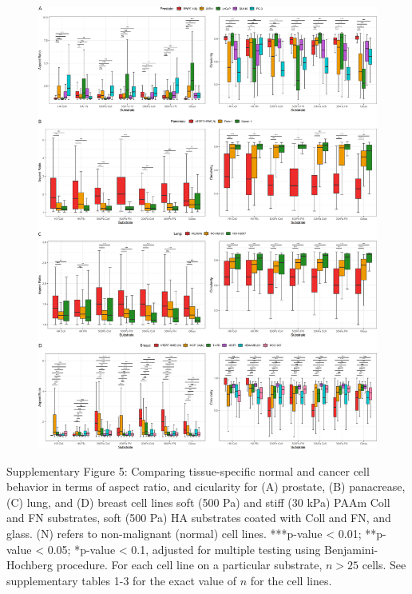 \documentclass[11pt,letterpaper,english,oneside]{article} %
\begin{document}
\begin{figure}[H]
    \hspace*{-1.5cm}
    \centering
    \includegraphics[scale=0.12]{../Figures/Supplementary_Figure5/supplementary_figure5.png}
    \caption{}
    \label{fig:fig5}
\end{figure}
\begin{adjustwidth}{1cm}{1cm}
  Supplementary Figure 5: Comparing tissue-specific normal and cancer cell behavior in terms of aspect ratio, and cicularity for (A) prostate, (B) panacrease, (C) lung, and (D) breast cell lines 
  soft (500 Pa) and stiff (30 kPa) PAAm Coll and FN substrates, soft (500 Pa) HA substrates coated with Coll and FN, and glass. (N) refers to non-malignant (normal) cell lines.
  ***p-value < 0.01; **p-value < 0.05; *p-value < 0.1, adjusted for multiple testing using Benjamini-Hochberg procedure. For each cell line on a particular substrate, $n > 25$ cells.
  See supplementary tables 1-3 for the exact value of $n$ for the cell lines.
\end{adjustwidth}
\end{document}
